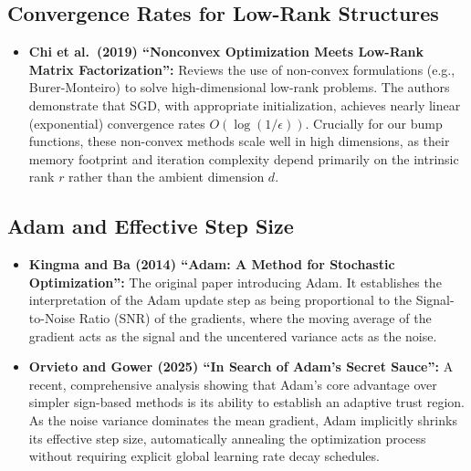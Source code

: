 \documentclass{article}
\begin{document}
\subsection*{Convergence Rates for Low-Rank Structures}
\begin{itemize}
    \item \textbf{\cite{chi2019nonconvex} Chi et al.\ (2019) ``Nonconvex Optimization Meets Low-Rank Matrix Factorization'':} Reviews the use of non-convex formulations (e.g., Burer-Monteiro) to solve high-dimensional low-rank problems. The authors demonstrate that SGD, with appropriate initialization, achieves nearly linear (exponential) convergence rates $O(\log(1/\epsilon))$. Crucially for our bump functions, these non-convex methods scale well in high dimensions, as their memory footprint and iteration complexity depend primarily on the intrinsic rank $r$ rather than the ambient dimension $d$.
\end{itemize}

\subsection*{Adam and Effective Step Size}
\begin{itemize}
    \item \textbf{\cite{kingma2014adam} Kingma and Ba (2014) ``Adam: A Method for Stochastic Optimization'':} The original paper introducing Adam. It establishes the interpretation of the Adam update step as being proportional to the Signal-to-Noise Ratio (SNR) of the gradients, where the moving average of the gradient acts as the signal and the uncentered variance acts as the noise.
    \item \textbf{\cite{orvieto2025adam} Orvieto and Gower (2025) ``In Search of Adam's Secret Sauce'':} A recent, comprehensive analysis showing that Adam's core advantage over simpler sign-based methods is its ability to establish an adaptive trust region. As the noise variance dominates the mean gradient, Adam implicitly shrinks its effective step size, automatically annealing the optimization process without requiring explicit global learning rate decay schedules.
\end{itemize}



\end{document}
